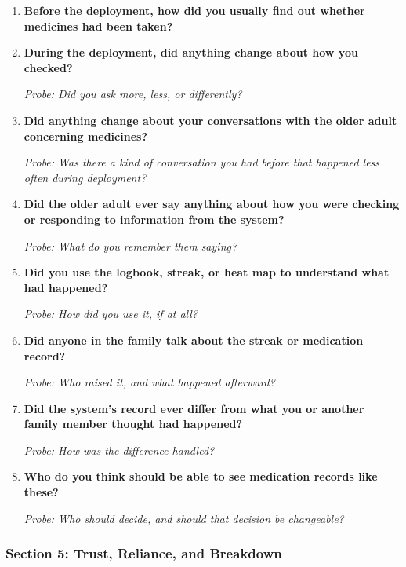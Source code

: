 \begin{enumerate}[resume]
  \item \textbf{Before the deployment, how did you usually find out whether medicines had been taken?}
  \item \textbf{During the deployment, did anything change about how you checked?}

  \textit{Probe: Did you ask more, less, or differently?}
  \item \textbf{Did anything change about your conversations with the older adult concerning medicines?}

  \textit{Probe: Was there a kind of conversation you had before that happened less often during deployment?}
  \item \textbf{Did the older adult ever say anything about how you were checking or responding to information from the system?}

  \textit{Probe: What do you remember them saying?}
  \item \textbf{Did you use the logbook, streak, or heat map to understand what had happened?}

  \textit{Probe: How did you use it, if at all?}
  \item \textbf{Did anyone in the family talk about the streak or medication record?}

  \textit{Probe: Who raised it, and what happened afterward?}
  \item \textbf{Did the system's record ever differ from what you or another family member thought had happened?}

  \textit{Probe: How was the difference handled?}
  \item \textbf{Who do you think should be able to see medication records like these?}

  \textit{Probe: Who should decide, and should that decision be changeable?}
\end{enumerate}

\subsubsection{Section 5: Trust, Reliance, and Breakdown}

